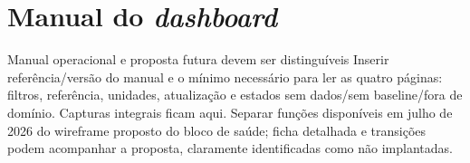 
\chapter{Manual do \emph{dashboard}}
\label{app:manual}
{Manual operacional e proposta futura devem ser distinguíveis}
{Inserir referência/versão do manual e o mínimo necessário para ler
as quatro páginas: filtros, referência, unidades, atualização e estados
sem dados/sem baseline/fora de domínio. Capturas integrais ficam aqui.
Separar funções disponíveis em julho de 2026 do wireframe proposto
do bloco de saúde; ficha detalhada e transições podem acompanhar a
proposta, claramente identificadas como não implantadas.}%


